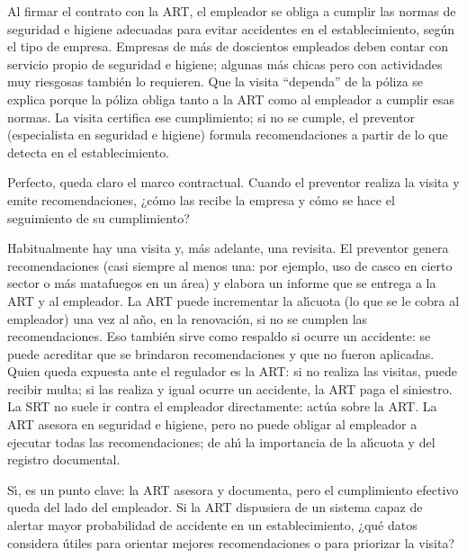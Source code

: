 \begin{description}[style=nextline, leftmargin=0cm, labelsep=0.35cm]
\item[\textbf{Entrevistado:}]
Al firmar el contrato con la ART, el empleador se obliga a cumplir las normas de seguridad e higiene adecuadas para evitar accidentes en el establecimiento, seg\'un el tipo de empresa.
Empresas de m\'as de doscientos empleados deben contar con servicio propio de seguridad e higiene; algunas m\'as chicas pero con actividades muy riesgosas tambi\'en lo requieren.
Que la visita ``dependa'' de la p\'oliza se explica porque la p\'oliza obliga tanto a la ART como al empleador a cumplir esas normas.
La visita certifica ese cumplimiento; si no se cumple, el preventor (especialista en seguridad e higiene) formula recomendaciones a partir de lo que detecta en el establecimiento.

\item[\textbf{Entrevistador:}]
Perfecto, queda claro el marco contractual.
Cuando el preventor realiza la visita y emite recomendaciones, ¿c\'omo las recibe la empresa y c\'omo se hace el seguimiento de su cumplimiento?

\item[\textbf{Entrevistado:}]
Habitualmente hay una visita y, m\'as adelante, una revisita.
El preventor genera recomendaciones (casi siempre al menos una: por ejemplo, uso de casco en cierto sector o m\'as matafuegos en un \'area) y elabora un informe que se entrega a la ART y al empleador.
La ART puede incrementar la al\'{\i}cuota (lo que se le cobra al empleador) una vez al a\~no, en la renovaci\'on, si no se cumplen las recomendaciones.
Eso tambi\'en sirve como respaldo si ocurre un accidente: se puede acreditar que se brindaron recomendaciones y que no fueron aplicadas.
Quien queda expuesta ante el regulador es la ART: si no realiza las visitas, puede recibir multa; si las realiza y igual ocurre un accidente, la ART paga el siniestro.
La SRT no suele ir contra el empleador directamente: act\'ua sobre la ART.
La ART asesora en seguridad e higiene, pero no puede obligar al empleador a ejecutar todas las recomendaciones; de ah\'{\i} la importancia de la al\'{\i}cuota y del registro documental.

\item[\textbf{Entrevistador:}]
S\'{\i}, es un punto clave: la ART asesora y documenta, pero el cumplimiento efectivo queda del lado del empleador.
Si la ART dispusiera de un sistema capaz de alertar mayor probabilidad de accidente en un establecimiento, ¿qu\'e datos considera \'utiles para orientar mejores recomendaciones o para priorizar la visita?


\end{description}
